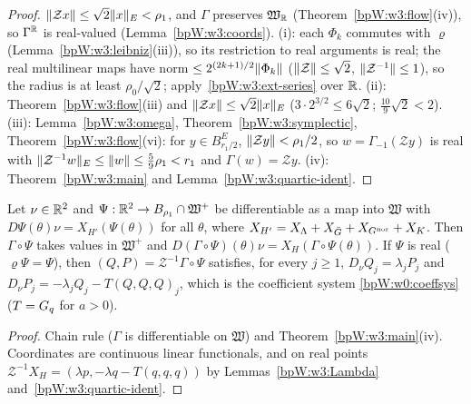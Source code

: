 \begin{proof}
$\lVert \mathcal Zx\rVert\le\sqrt2\lVert x\rVert_E<\rho_1$, and $\Gamma$ preserves $\mathfrak W_{\mathbb{R}}$ (Theorem~\ref{bpW:w3:flow}(iv)),
so $\Gamma^{\mathbb{R}}$ is real-valued (Lemma~\ref{bpW:w3:coords}). (i): each $\Phi_k$ commutes with $\varrho$
(Lemma~\ref{bpW:w3:leibniz}(iii)), so its restriction to real arguments is real; the real multilinear maps have
norm $\le2^{(2k+1)/2}\lVert \Phi_k\rVert$ ($\lVert \mathcal Z\rVert\le\sqrt2$, $\lVert \mathcal Z^{-1}\rVert\le1$), so the radius is
at least $\rho_0/\sqrt2$; apply~\ref{bpW:w3:ext-series} over $\mathbb{R}$. (ii): Theorem~\ref{bpW:w3:flow}(iii) and
$\lVert \mathcal Zx\rVert\le\sqrt2\lVert x\rVert_E$ ($3\cdot2^{3/2}\le6\sqrt2$; $\frac{10}9\sqrt2<2$). (iii): Lemma~\ref{bpW:w3:omega},
Theorem~\ref{bpW:w3:symplectic}, Theorem~\ref{bpW:w3:flow}(vi): for $y\in B^E_{r_1/2}$, $\lVert \mathcal Zy\rVert<\rho_1/2$, so
$w=\Gamma_{-1}(\mathcal Zy)$ is real with $\lVert \mathcal Z^{-1}w\rVert_E\le\lVert w\rVert\le\frac59\rho_1<r_1$ and $\Gamma(w)=\mathcal Zy$.
(iv): Theorem~\ref{bpW:w3:main} and Lemma~\ref{bpW:w3:quartic-ident}.
\end{proof}

\begin{corollary}\label{bpW:w3:transport-tori}
Let $\nu\in\mathbb{R}^2$ and $\Psi:\mathbb{R}^2\to B_{\rho_1}\cap\mathfrak W^+$ be differentiable as a map into $\mathfrak W$ with
$D\Psi(\theta)\nu=X_{H'}(\Psi(\theta))$ for all $\theta$, where $X_{H'}=X_\Lambda+X_{\bar G}+X_{G^{\rm nor}}+X_K$.
Then $\Gamma\circ\Psi$ takes values in $\mathfrak W^+$ and $D(\Gamma\circ\Psi)(\theta)\nu=X_H(\Gamma\circ\Psi(\theta))$.
If $\Psi$ is real ($\varrho\Psi=\Psi$), then $(Q,P)=\mathcal Z^{-1}\Gamma\circ\Psi$ satisfies, for every $j\ge1$,
$D_\nu Q_j=\lambda_jP_j$ and $D_\nu P_j=-\lambda_jQ_j-T(Q,Q,Q)_j$, which is the coefficient system
\eqref{bpW:w0:coeffsys} ($T=G_q$ for $a>0$).
\end{corollary}

\begin{proof}
Chain rule ($\Gamma$ is differentiable on $\mathfrak W$) and Theorem~\ref{bpW:w3:main}(iv). Coordinates are
continuous linear functionals, and on real points $\mathcal Z^{-1}X_H=(\lambda p,-\lambda q-T(q,q,q))$ by
Lemmas~\ref{bpW:w3:Lambda} and~\ref{bpW:w3:quartic-ident}.
\end{proof}

